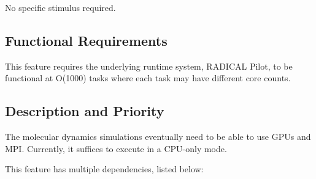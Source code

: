 \documentclass{scrreprt}
\begin{document}
No specific stimulus required.

\subsection{Functional Requirements}


This feature requires the underlying runtime system, RADICAL Pilot, to be functional at O(1000) tasks where each task may have different core counts.

\subsection{Description and Priority}

The molecular dynamics simulations eventually need to be able to use GPUs and MPI. Currently, it suffices to execute in a CPU-only mode.

This feature has multiple dependencies, listed below:
\end{document}
